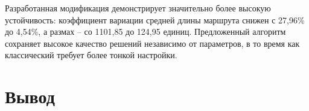 Разработанная модификация демонстрирует значительно более высокую устойчивость: коэффициент вариации средней длины маршрута снижен с 27,96\% до 4,54\%, а размах – со 1101,85 до 124,95 единиц. Предложенный алгоритм сохраняет высокое качество решений независимо от параметров, в то время как классический требует более тонкой настройки.

\section*{Вывод}